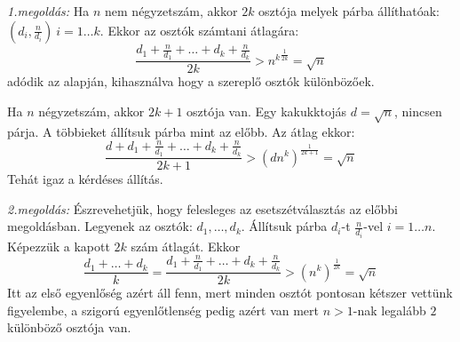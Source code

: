    \par {\it 1.megoldás:} Ha $n$ nem négyzetszám, akkor $2k$ osztója melyek
   párba állíthatóak: $(d_{i},\frac{n}{d_{i}})\ i=1\hdots k$. Ekkor az osztók számtani átlagára:
   \begin{equation*}
   \frac{d_{1}+\frac{n}{d_{1}}+\hdots +d_{k}+\frac{n}{d_{k}}}{2k} >
   {n^{k}}^{\frac{1}{2k}}=\sqrt{n}
   \end{equation*}
   adódik az  alapján, kihasználva hogy a szereplő osztók különbözőek.
   \par Ha $n$ négyzetszám, akkor $2k+1$ osztója van. Egy kakukktojás $d=\sqrt{n}$,  
   nincsen párja. A többieket állítsuk párba mint az előbb. Az átlag ekkor:
   \begin{equation*}
   \frac{d+d_{1}+\frac{n}{d_{1}}+\hdots +d_{k}+\frac{n}{d_{k}}}{2k+1} >
   {(dn^{k})}^{\frac{1}{2k+1}}=\sqrt{n}
   \end{equation*}
   Tehát igaz a kérdéses állítás.
   \par {\it 2.megoldás:} Észrevehetjük, hogy felesleges az esetszétválasztás az 
   előbbi megoldásban. Legyenek az osztók: $d_{1},\hdots,d_{k}$. Állítsuk párba 
   $d_{i}$-t $\frac{n}{d_{i}}$-vel $i=1\hdots n$. Képezzük a kapott $2k$ szám átlagát. 
   Ekkor
   \begin{equation*}
   \frac{d_{1}+ \hdots +d_{k}}{k} =
   \frac{d_{1}+\frac{n}{d_{1}}+\hdots +d_{k}+\frac{n}{d_{k}}}{2k} >
   {(n^{k})}^{\frac{1}{2k}}=\sqrt{n}
   \end{equation*}
   Itt az első egyenlőség azért áll fenn, mert minden osztót pontosan kétszer 
   vettünk figyelembe, a szigorú egyenlőtlenség pedig azért van mert $n>1$-nak 
   legalább $2$ különböző osztója van.
